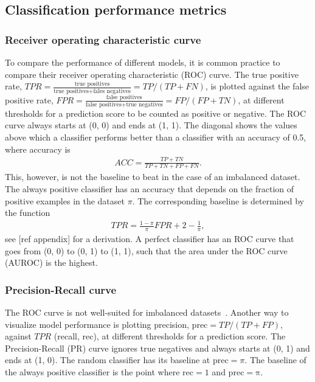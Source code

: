 \subsection{Classification performance metrics}

\subsubsection{Receiver operating characteristic curve}

To compare the performance of different models, it is common practice to compare their receiver operating characteristic (ROC) curve.
The true positive rate, $TPR = \frac{\text{true positives}}{\text{true positives} + \text{fales negatives}} = TP / (TP + FN)$, is plotted against the false positive rate, $FPR = \frac{\text{false positives}}{\text{false positives} + \text{true negatives}} = FP / (FP + TN)$, at different thresholds for a prediction score to be counted as positive or negative.
The ROC curve always starts at (0, 0) and ends at (1, 1).
The diagonal shows the values above which a classifier performs better than a classifier with an accuracy of 0.5, where accuracy is
\begin{align}
    ACC = \frac{TP + TN}{TP + TN + FP + FN}.
\end{align}
This, however, is not the baseline to beat in the case of an imbalanced dataset.
The always positive classifier has an accuracy that depends on the fraction of positive examples in the dataset $\pi$.
The corresponding baseline is determined by the function
\begin{align}
    TPR = \frac{1 - \pi}{\pi} FPR + 2 - \frac{1}{\pi},
\end{align}
see [ref appendix] for a derivation.
A perfect classifier has an ROC curve that goes from (0, 0) to (0, 1) to (1, 1), such that the area under the ROC curve (AUROC) is the highest.

\subsubsection{Precision-Recall curve}
The ROC curve is not well-suited for imbalanced datasets~\cite{Takaya2015}.
Another way to visualize model performance is plotting precision, $\mathrm{prec} = TP / (TP + FP)$, against $TPR$ (recall, rec), at different thresholds for a prediction score.
The Precision-Recall (PR) curve ignores true negatives and always starts at (0, 1) and ends at (1, 0).
The random classifier has its baseline at $\mathrm{prec} = \pi$.
The baseline of the always positive classifier is the point where $\mathrm{rec} = 1$ and $\mathrm{prec = \pi}$.

